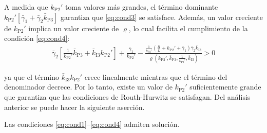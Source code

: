 A medida que $k_{\textrm{P2}}'$ toma valores más grandes, el término dominante $k_{\textrm{P2}}'\left[\bar{\gamma}_1 + \bar{\gamma}_2 \bar{k}_{\textrm{P3}}\right]$ garantiza que \eqref{eq:cond3} se satisface. Además, un valor creciente de $k_{\textrm{P2}}'$ implica un valor creciente de $\varrho$, lo cual facilita el cumplimiento de la condición \eqref{eq:cond4}:
\begin{align}
\bar{\gamma}_2 \left[\frac{1}{k_{\textrm{P2}}'}\bar{k}_{\textrm{P3}} + \bar{k}_{\textrm{I3}}k_{\textrm{P2}}'\right] + \frac{\bar{\gamma}_1}{k_{\textrm{P2}}'} - \frac{\frac{1}{k_{\textrm{P2}}'}\left(\frac{R}{L} + k_{\textrm{P2}}' + \bar{\gamma}_1\right)\bar{\gamma}_2\bar{k}_{\textrm{I3}}}{\varrho\left(k_{\textrm{P2}}',\bar{k}_{\textrm{P3}},\frac{1}{k_{\textrm{P2}}'},\bar{k}_{\textrm{I3}}\right)} > 0
\end{align}

ya que el término $\bar{k}_{\textrm{I3}}k_{\textrm{P2}}'$ crece linealmente mientras 
que el término del denominador decrece. Por lo tanto, existe un valor de 
$k_{\textrm{P2}}'$ suficientemente grande que garantiza que las condiciones 
de Routh-Hurwitz se satisfagan. Del análisis anterior se puede hacer la siguiente
aserción.

\begin{lemma}\label{lem:conds}
    Las condiciones \eqref{eq:cond1}--\eqref{eq:cond4} admiten solución. \tripletriang
\end{lemma}

